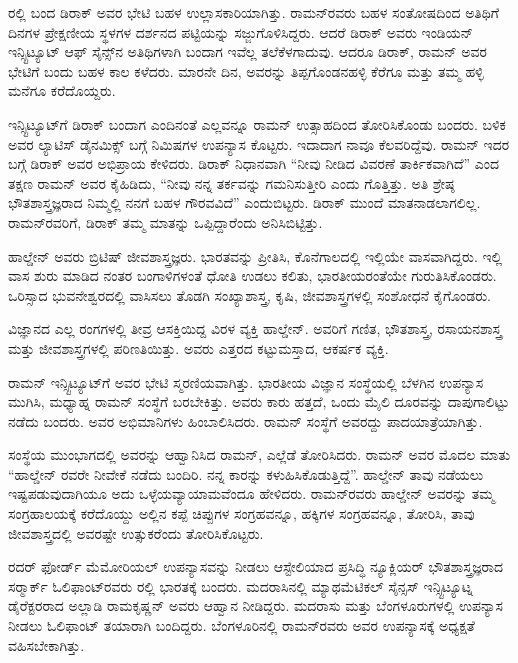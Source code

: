 
ರಲ್ಲಿ ಬಂದ ಡಿರಾಕ್ ಅವರ ಭೇಟಿ ಬಹಳ ಉಲ್ಲಾಸಕಾರಿಯಾಗಿತ್ತು. ರಾಮನ್‍ರವರು ಬಹಳ ಸಂತೋಷದಿಂದ ಅತಿಥಿಗೆ \enginline{-}ದಿನಗಳ ಪ್ರೇಕ್ಷಣೀಯ ಸ್ಥಳಗಳ ದರ್ಶನದ ಪಟ್ಟಿಯನ್ನು ಸಜ್ಜುಗೊಳಿಸಿದ್ದರು. ಆದರೆ ಡಿರಾಕ್ ಅವರು ಇಂಡಿಯನ್ ಇನ್ಸ್ಟಿಟ್ಯೂಟ್ ಆಫ್ ಸೈನ್ಸ್‌ನ ಅತಿಥಿಗಳಾಗಿ ಬಂದಾಗ ಇವೆಲ್ಲ ತಲೆಕೆಳಗಾದುವು. ಆದರೂ ಡಿರಾಕ್, ರಾಮನ್ ಅವರ ಭೇಟಿಗೆ ಬಂದು ಬಹಳ ಕಾಲ ಕಳೆದರು. ಮಾರನೇ ದಿನ, ಅವರನ್ನು ತಿಪ್ಪಗೊಂಡನಹಳ್ಳಿ ಕೆರೆಗೂ ಮತ್ತು ತಮ್ಮ ಹಳ್ಳಿ ಮನೆಗೂ ಕರೆದೊಯ್ದರು.

ಇನ್ಸ್ಟಿಟ್ಯೂಟ್‍ಗೆ ಡಿರಾಕ್ ಬಂದಾಗ ಎಂದಿನಂತೆ ಎಲ್ಲವನ್ನೂ ರಾಮನ್ ಉತ್ಸಾಹದಿಂದ ತೋರಿಸಿಕೊಂಡು ಬಂದರು. ಬಳಿಕ ಅವರ ಲ್ಯಾಟಿಸ್ ಡೈನಮಿಕ್ಸ್ ಬಗ್ಗೆ  ನಿಮಿಷಗಳ ಉಪನ್ಯಾಸ ಕೊಟ್ಟರು. ಇದಾದಾಗ ನಾವೂ ಕೆಲವರಿದ್ದೆವು. ರಾಮನ್ ಇದರ ಬಗ್ಗೆ ಡಿರಾಕ್ ಅವರ ಅಭಿಪ್ರಾಯ ಕೇಳಿದರು. ಡಿರಾಕ್ ನಿಧಾನವಾಗಿ “ನೀವು ನೀಡಿದ ವಿವರಣೆ ತಾರ್ಕಿಕವಾಗಿದೆ” ಎಂದ ತಕ್ಷಣ ರಾಮನ್ ಅವರ ಕೈಹಿಡಿದು, “ನೀವು ನನ್ನ ತರ್ಕವನ್ನು ಗಮನಿಸುತ್ತೀರಿ ಎಂದು ಗೊತ್ತಿತ್ತು. ಅತಿ ಶ್ರೇಷ್ಠ ಭೌತಶಾಸ್ತ್ರಜ್ಞರಾದ ನಿಮ್ಮಲ್ಲಿ ನನಗೆ ಬಹಳ ಗೌರವವಿದೆ” ಎಂದುಬಿಟ್ಟರು. ಡಿರಾಕ್ ಮುಂದೆ ಮಾತನಾಡಲಾಗಲಿಲ್ಲ. ರಾಮನ್‍ರವರಿಗೆ, ಡಿರಾಕ್ ತಮ್ಮ ಮಾತನ್ನು ಒಪ್ಪಿದ್ದಾರೆಂದು ಅನಿಸಿಬಿಟ್ಟಿತ್ತು.



ಹಾಲ್ಡೇನ್ ಅವರು ಬ್ರಿಟಿಷ್ ಜೀವಶಾಸ್ತ್ರಜ್ಞರು. ಭಾರತವನ್ನು ಪ್ರೀತಿಸಿ, ಕೊನೆಗಾಲದಲ್ಲಿ ಇಲ್ಲಿಯೇ ವಾಸವಾಗಿದ್ದರು. ಇಲ್ಲಿ ವಾಸ ಶುರು ಮಾಡಿದ ನಂತರ ಬಂಗಾಳಿಗಳಂತೆ ಧೋತಿ ಉಡಲು ಕಲಿತು, ಭಾರತೀಯರಂತೆಯೇ ಗುರುತಿಸಿಕೊಂಡರು. ಒರಿಸ್ಸಾದ ಭುವನೇಶ್ವರದಲ್ಲಿ ವಾಸಿಸಲು ತೊಡಗಿ ಸಂಖ್ಯಾಶಾಸ್ತ್ರ, ಕೃಷಿ, ಜೀವಶಾಸ್ತ್ರಗಳಲ್ಲಿ ಸಂಶೋಧನೆ ಕೈಗೊಂಡರು.

ವಿಜ್ಞಾನದ ಎಲ್ಲ ರಂಗಗಳಲ್ಲಿ ತೀವ್ರ ಆಸಕ್ತಿಯಿದ್ದ ವಿರಳ ವ್ಯಕ್ತಿ ಹಾಲ್ಡೇನ್. ಅವರಿಗೆ ಗಣಿತ, ಭೌತಶಾಸ್ತ್ರ, ರಸಾಯನಶಾಸ್ತ್ರ ಮತ್ತು ಜೀವಶಾಸ್ತ್ರಗಳಲ್ಲಿ ಪರಿಣತಿಯಿತ್ತು. ಅವರು ಎತ್ತರದ ಕಟ್ಟುಮಸ್ತಾದ, ಆಕರ್ಷಕ ವ್ಯಕ್ತಿ.

ರಾಮನ್ ಇನ್ಸ್ಟಿಟ್ಯೂಟ್‍ಗೆ ಅವರ ಭೇಟಿ ಸ್ಮರಣಿಯವಾಗಿತ್ತು. ಭಾರತೀಯ ವಿಜ್ಞಾನ ಸಂಸ್ಥೆಯಲ್ಲಿ ಬೆಳಗಿನ ಉಪನ್ಯಾಸ ಮುಗಿಸಿ, ಮಧ್ಯಾಹ್ನ ರಾಮನ್ ಸಂಸ್ಥೆಗೆ ಬರಬೇಕಿತ್ತು. ಅವರು ಕಾರು ಹತ್ತದೆ, ಒಂದು ಮೈಲಿ ದೂರವನ್ನು ದಾಪುಗಾಲಿಟ್ಟು ನಡೆದು ಬಂದರು. ಅವರ ಅಭಿಮಾನಿಗಳು ಹಿಂಬಾಲಿಸಿದರು. ರಾಮನ್ ಸಂಸ್ಥೆಗೆ ಅವರದ್ದು ಪಾದಯಾತ್ರೆಯಾಗಿತ್ತು.

ಸಂಸ್ಥೆಯ ಮುಂಭಾಗದಲ್ಲಿ ಅವರನ್ನು ಆಹ್ವಾನಿಸಿದ ರಾಮನ್, ಎಲ್ಲೆಡೆ ತೋರಿಸಿದರು. ರಾಮನ್ ಅವರ ಮೊದಲ ಮಾತು “ಹಾಲ್ಡೇನ್ ರವರೇ ನೀವೇಕೆ ನಡೆದು ಬಂದಿರಿ. ನನ್ನ ಕಾರನ್ನು ಕಳುಹಿಸಿಕೊಡುತ್ತಿದ್ದೆ”. ಹಾಲ್ಡೇನ್ ತಾವು ನಡೆಯಲು ಇಷ್ಟಪಡುವುದಾಗಿಯೂ ಅದು ಒಳ್ಳೆಯ\break ವ್ಯಾಯಾಮವೆಂದೂ ಹೇಳಿದರು. ರಾಮನ್‍ರವರು ಹಾಲ್ಡೇನ್ ಅವರನ್ನು ತಮ್ಮ ಸಂಗ್ರಹಾಲಯಕ್ಕೆ ಕರೆದೊಯ್ದು ಅಲ್ಲಿನ ಕಪ್ಪೆ ಚಿಪ್ಪುಗಳ ಸಂಗ್ರಹವನ್ನೂ, ಹಕ್ಕಿಗಳ ಸಂಗ್ರಹವನ್ನೂ, ತೋರಿಸಿ, ತಾವು ಜೀವಶಾಸ್ತ್ರದಲ್ಲಿ ಅವರಷ್ಟೇ ಉತ್ಸುಕರೆಂದು ತೋರಿಸಿಕೊಟ್ಟರು.



ರದರ್ ಫೋರ್ಡ್ ಮೆಮೋರಿಯಲ್ ಉಪನ್ಯಾಸವನ್ನು ನೀಡಲು ಆಸ್ಟೇಲಿಯಾದ ಪ್ರಸಿದ್ಧಿ ನ್ಯೂಕ್ಲಿಯರ್ ಭೌತಶಾಸ್ತ್ರಜ್ಞರಾದ ಸರ್‍ಮಾರ್ಕ್ ಓಲಿಫಾಂಟ್‍ರವರು ರಲ್ಲಿ ಭಾರತಕ್ಕೆ ಬಂದರು. ಮದರಾಸಿನಲ್ಲಿ ಮ್ಯಾಥಮೆಟಿಕಲ್ ಸೈನ್ಸಸ್ ಇನ್ಸ್ಟಿಟ್ಯೂಟ್ನ ಡೈರೆಕ್ಟರರಾದ ಅಲ್ಲಾಡಿ ರಾಮಕೃಷ್ಣನ್ ಅವರು ಆಹ್ವಾನ ನೀಡಿದ್ದರು. ಮದರಾಸು ಮತ್ತು ಬೆಂಗಳೂರುಗಳಲ್ಲಿ ಉಪನ್ಯಾಸ ನೀಡಲು ಓಲಿಫಾಂಟ್ ತಯಾರಾಗಿ ಬಂದಿದ್ದರು. ಬೆಂಗಳೂರಿನಲ್ಲಿ ರಾಮನ್‍ರವರು ಅವರ ಉಪನ್ಯಾಸಕ್ಕೆ ಅಧ್ಯಕ್ಷತೆ ವಹಿಸಬೇಕಾಗಿತ್ತು.


